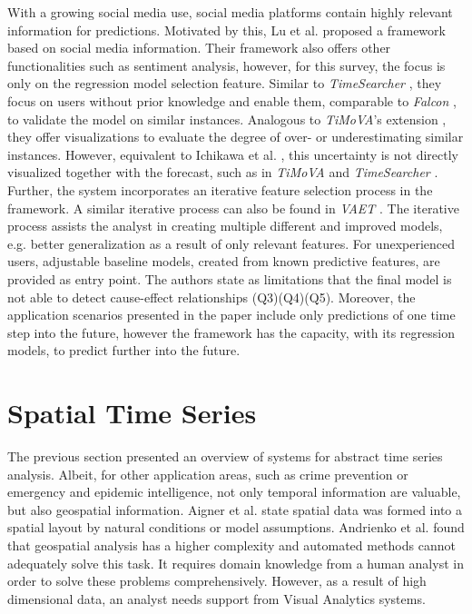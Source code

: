 \documentclass[electronic]{vgtc}             %
\begin{document}
With a growing social media use, social media platforms contain highly relevant information for predictions. 
Motivated by this, Lu et al. \cite{lu:2014} proposed a framework based on social media information. 
Their framework also offers other functionalities such as sentiment analysis, however, for this survey, the focus is only on the regression model selection feature.
Similar to \textit{TimeSearcher} \cite{buono:2007}, they focus on users without prior knowledge and enable them, comparable to \textit{Falcon} \cite{steed:2017}, to validate the model on similar instances. 
Analogous to \textit{TiMoVA}'s extension \cite{boegl:2014}, they offer visualizations to evaluate the degree of over- or underestimating similar instances.
However, equivalent to Ichikawa et al. \cite{ichikawa:2002}, this uncertainty is not directly visualized together with the forecast, such as in \textit{TiMoVA} \cite{boegl:2013} and \textit{TimeSearcher} \cite{buono:2007}.
Further, the system incorporates an iterative feature selection process in the framework.
A similar iterative process can also be found in \textit{VAET} \cite{Xie:2014}.
The iterative process assists the analyst in creating multiple different and improved models, e.g. better generalization as a result of only relevant features.
For unexperienced users, adjustable baseline models, created from known predictive features, are provided as entry point.
The authors state as limitations that the final model is not able to detect cause-effect relationships (Q3)(Q4)(Q5). 
Moreover, the application scenarios presented in the paper include only predictions of one time step into the future, however the framework has the capacity, with its regression models, to predict further into the future.

\section{Spatial Time Series\label{sec:spatiotemp}}
The previous section presented an overview of systems for abstract time series analysis. 
Albeit, for other application areas, such as crime prevention or emergency and epidemic intelligence, not only temporal information are valuable, but also geospatial information.
Aigner et al. \cite{Aigner:2007} state spatial data was formed into a spatial layout by natural conditions or model assumptions.
Andrienko et al. \cite{Andrienko:2008, Andrienko:2010:Space} found that geospatial analysis has a higher complexity and automated methods cannot adequately solve this task. 
It requires domain knowledge from a human analyst in order to solve these problems comprehensively.
However, as a result of high dimensional data, an analyst needs support from Visual Analytics systems.
\end{document}
